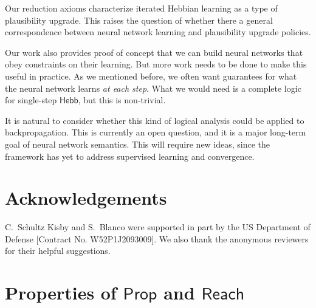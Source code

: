 \documentclass[letterpaper]{article}
\theoremstyle{definition}
\newcommand{\Prop}{\mathsf{Prop}}
\newcommand{\Reach}{\mathsf{Reach}}
\newcommand{\HebbNoArgs}{\mathsf{Hebb}}
\begin{document}
Our reduction axioms characterize iterated Hebbian learning as a type of plausibility upgrade.  This raises the question of whether there a general correspondence between neural network learning and plausibility upgrade policies.

Our work also provides proof of concept that we can build neural networks that obey constraints on their learning.  But more work needs to be done to make this useful in practice.  As we mentioned before, we often want guarantees for what the neural network learns \emph{at each step}.  What we would need is a complete logic for single-step $\HebbNoArgs$, but this is non-trivial.

It is natural to consider whether this kind of logical analysis could be applied to backpropagation.  This is currently an open question, and it is a major long-term goal of neural network semantics.  This will require new ideas, since the framework has yet to address  supervised learning and convergence.

\section*{Acknowledgements}
C.~Schultz Kisby and S.~Blanco were supported in part by the US Department of Defense [Contract No. W52P1J2093009].  We also thank the anonymous reviewers for their helpful suggestions.



\newpage
\appendix
\appendixpage

\section{Properties of $\Prop$ and $\Reach$}
\end{document}
